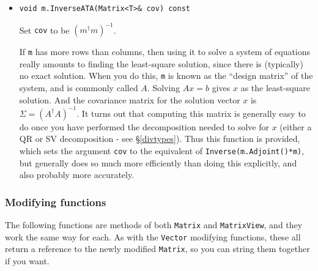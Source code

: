 \documentclass[twoside,letterpaper,11pt]{article}
\renewcommand{\tt}[1]{{\texttt {#1}}}
\begin{document}
\begin{itemize}
\item
\begin{verbatim}
void m.InverseATA(Matrix<T>& cov) const
\end{verbatim}
Set \tt{cov} to be $(m^\dagger m)^{-1}$.

If \tt{m} has more rows than columns, then using it to solve a system of equations
really amounts to finding the least-square solution, since there is (typically) no
exact solution.  When you do this, \tt{m} is known as the ``design matrix'' of the system,
and is commonly called $A$.  Solving $A x=b$ gives $x$ as the least-square 
solution.  And the covariance matrix for the solution vector $x$ is 
$\Sigma = (A^\dagger A)^{-1}$.
It turns out that computing this matrix is generally easy to do once you have 
performed the decomposition needed to solve for $x$ (either a QR or SV 
decomposition - see \S\ref{divtypes}).  
Thus this function is provided, which sets the
argument \tt{cov} to the equivalent of \tt{Inverse(m.Adjoint()*m)}, 
but generally does so much more efficiently than doing this explicitly, 
and also probably more accurately.

\end{itemize}

\subsubsection{Modifying functions}

The following functions are methods of both \tt{Matrix} and \tt{MatrixView},
and they work the same way for each.
As with the \tt{Vector} modifying functions, these all return a reference
to the newly modified \tt{Matrix}, so you can string them together if you want.
\end{document}
